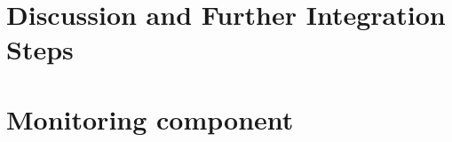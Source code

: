 \documentclass{SmartReport}
\begin{document}
\section{Discussion and Further Integration Steps}
\label{sec:concl}

\newpage



\appendix
\section{Monitoring component}\label{app:monitoring}

\end{document}
